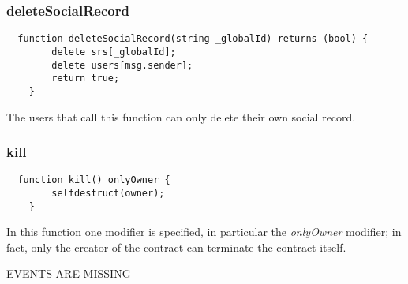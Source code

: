 \subsubsection{deleteSocialRecord}
\begin{lstlisting}
  function deleteSocialRecord(string _globalId) returns (bool) {
        delete srs[_globalId];
        delete users[msg.sender];
        return true;
    }
\end{lstlisting}
The users that call this function can only delete their own social record.

\subsubsection{kill}
\begin{lstlisting}
  function kill() onlyOwner {
        selfdestruct(owner);
    }
\end{lstlisting}
In this function one modifier is specified, in particular the \textit{onlyOwner} modifier; in fact, only the creator of the contract can terminate the contract itself. 





\begin{notation}
    EVENTS ARE MISSING
\end{notation}
